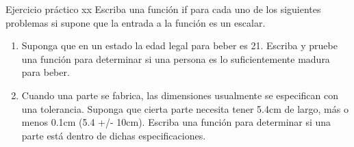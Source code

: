 \documentclass{bredelebeamer}
\begin{document}
\begin{frame}{Ejercicio práctico xx}
Escriba una función if para cada uno de los siguientes problemas si supone que la entrada a la función es un escalar.
\begin{enumerate}
\item Suponga que en un estado la edad legal para beber es 21. Escriba y pruebe una función para determinar si una persona es lo suficientemente madura para beber.
\item Cuando una parte se fabrica, las dimensiones usualmente se especifican con una tolerancia. Suponga que cierta parte necesita tener 5.4cm de largo, más o menos 0.1cm (5.4 +/- 10cm). Escriba una función para determinar si una parte está dentro de dichas especificaciones.
\end{enumerate}
\end{frame}
\end{document}
